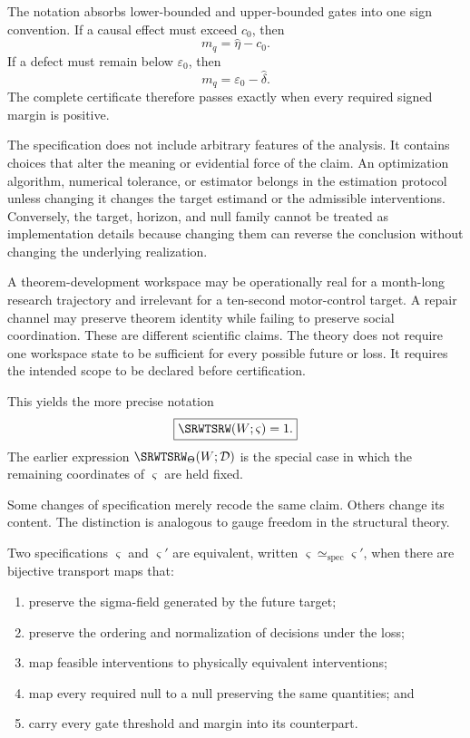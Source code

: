 The notation absorbs lower-bounded and upper-bounded gates into one sign
convention. If a causal effect must exceed \(c_0\), then
\[
m_q=\widehat\eta-c_0.
\]
If a defect must remain below \(\varepsilon_0\), then
\[
m_q=\varepsilon_0-\widehat\delta.
\]
The complete certificate therefore passes exactly when every required signed
margin is positive.

The specification does not include arbitrary features of the analysis. It
contains choices that alter the meaning or evidential force of the claim. An
optimization algorithm, numerical tolerance, or estimator belongs in the
estimation protocol unless changing it changes the target estimand or the
admissible interventions. Conversely, the target, horizon, and null family
cannot be treated as implementation details because changing them can reverse
the conclusion without changing the underlying realization.


A theorem-development workspace may be operationally real for a month-long
research trajectory and irrelevant for a ten-second motor-control target. A
repair channel may preserve theorem identity while failing to preserve social
coordination. These are different scientific claims. The theory does not
require one workspace state to be sufficient for every possible future or loss.
It requires the intended scope to be declared before certification.

This yields the more precise notation
\[
\boxed{
\SRWTSRW(W;\varsigma)=1.
}
\]
The earlier expression \(\SRWTSRW_\Theta(W;\mathcal D)\) is the special case in
which the remaining coordinates of \(\varsigma\) are held fixed.


Some changes of specification merely recode the same claim. Others change its
content. The distinction is analogous to gauge freedom in the structural
theory.

\begin{SRWTdefinition}\label{SRWT:def:spec-equivalence}
Two specifications \(\varsigma\) and \(\varsigma'\) are equivalent, written
\(\varsigma\simeq_{\mathrm{spec}}\varsigma'\), when there are bijective
transport maps that:
\begin{enumerate}
\item preserve the sigma-field generated by the future target;
\item preserve the ordering and normalization of decisions under the loss;
\item map feasible interventions to physically equivalent interventions;
\item map every required null to a null preserving the same quantities; and
\item carry every gate threshold and margin into its counterpart.
\end{enumerate}
\end{SRWTdefinition}

